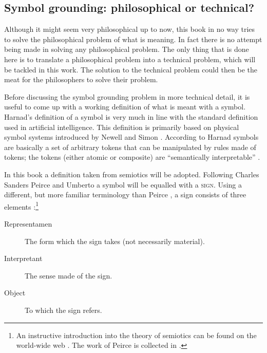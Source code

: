 \subsection{Symbol grounding: philosophical or technical?}

\label{s:intro:semiotic}

Although it might seem very philosophical up to now, this book in no way tries to solve the philosophical problem of what is meaning. In fact there is no attempt being made in solving any philosophical problem. The only thing that is done here is to translate a philosophical problem into a technical problem, which will be tackled in this work. The solution to the technical problem could then be the meat for the philosophers to solve their problem.


Before discussing the symbol grounding problem in more technical detail, it is useful to come up with a working definition of what is meant with a symbol. Harnad's definition of a symbol is very much in line with the standard definition used in artificial intelligence. This definition is primarily based on physical symbol systems introduced by Newell and Simon \citet{newell:1980,newell:1990}. According to Harnad symbols are basically a set of arbitrary tokens that can be manipulated by rules made of tokens; the tokens (either atomic or composite) are ``semantically interpretable'' \citep{harnad:1990}.


In this book a definition taken from semiotics will be adopted. Following Charles Sanders Peirce and Umberto \citet{eco:1976,eco:1986} a symbol will be equalled with a \textsc{sign}. Using a different, but more familiar terminology than Peirce  \citet{noth:1990}, a sign consists of three elements \citep{chandler:1994}:\footnote{An instructive introduction into the theory of semiotics can be found on the world-wide web \citep{chandler:1994}. The work of Peirce is collected in \citealt{peirce:1931}.}

\begin{description}
\item[Representamen] The form which the sign takes (not necessarily material).
\item[Interpretant] The sense made of the sign.
\item[Object] To which the sign refers. 
\end{description}

